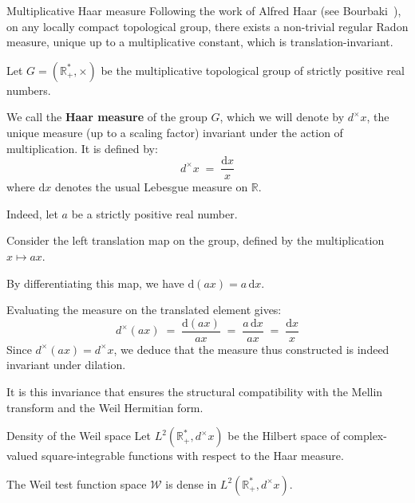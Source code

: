 \documentclass[Riemann_Hypothesis.tex]{subfiles}
\begin{document}
\begin{DefNefEn}[label=df:MesureHaar]{Multiplicative Haar measure}
    Following the work of Alfred Haar (see Bourbaki~\cite{Haar_bourbaki_integration_chap7_en}), on any locally compact topological group, there exists a non-trivial regular Radon measure, unique up to a multiplicative constant, which is translation-invariant. \par
    Let $G = \left(\mathbb{R}_+^*, \times\right)$ be the multiplicative topological group of strictly positive real numbers. \par
    We call the \textbf{Haar measure} of the group $G$, which we will denote by $d^\times x$, the unique measure (up to a scaling factor) invariant under the action of multiplication. It is defined by:
    \begin{equation*}
        d^\times x \;=\; \frac{\mathrm{d}x}{x}
    \end{equation*}
    where $\mathrm{d}x$ denotes the usual Lebesgue measure on $\mathbb{R}$. \par
    Indeed, let $a$ be a strictly positive real number. \par
    Consider the left translation map on the group, defined by the multiplication $x \mapsto ax$. \par
    By differentiating this map, we have $\mathrm{d}(ax) = a \, \mathrm{d}x$. \par
    Evaluating the measure on the translated element gives:
    \begin{equation*}
        d^\times (ax) \;=\; \frac{\mathrm{d}(ax)}{ax} \;=\; \frac{a \, \mathrm{d}x}{ax} \;=\; \frac{\mathrm{d}x}{x}
    \end{equation*}
    Since $d^\times (ax) = d^\times x$, we deduce that the measure thus constructed is indeed invariant under dilation. 

    It is this invariance that ensures the structural compatibility with the Mellin transform and the Weil Hermitian form.
\end{DefNefEn}


\begin{lemmaEn}[label=lm:DensiteWeil]{Density of the Weil space}
    Let $L^2(\mathbb{R}_+^*, d^\times x)$ be the Hilbert space of complex-valued square-integrable functions with respect to the Haar measure. \par
    The Weil test function space $\mathcal{W}$ is dense in $L^2(\mathbb{R}_+^*, d^\times x)$.
\end{lemmaEn}
\end{document}
